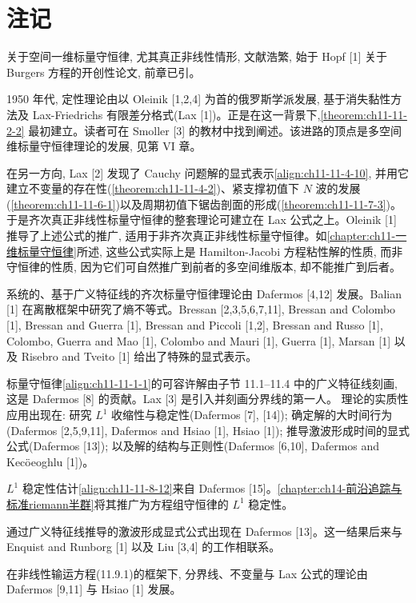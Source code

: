 \documentclass[../../main.tex]{subfiles}
\begin{document}
\section{注记}\label{section:ch11-注记}

关于空间一维标量守恒律, 尤其真正非线性情形, 文献浩繁, 始于 Hopf [1] 关于 Burgers 方程的开创性论文, 前章已引。

1950 年代, 定性理论由以 Oleinik [1,2,4] 为首的俄罗斯学派发展, 基于消失黏性方法及 Lax-Friedrichs 有限差分格式(Lax [1])。正是在这一背景下,\cref{theorem:ch11-11-2-2} 最初建立。读者可在 Smoller [3] 的教材中找到阐述。该进路的顶点是多空间维标量守恒律理论的发展, 见第 VI 章。

在另一方向, Lax [2] 发现了 Cauchy 问题解的显式表示\eqref{align:ch11-11-4-10}, 并用它建立不变量的存在性(\cref{theorem:ch11-11-4-2})、紧支撑初值下 $N$ 波的发展(\cref{theorem:ch11-11-6-1})以及周期初值下锯齿剖面的形成(\cref{theorem:ch11-11-7-3})。于是齐次真正非线性标量守恒律的整套理论可建立在 Lax 公式之上。Oleinik [1] 推导了上述公式的推广, 适用于非齐次真正非线性标量守恒律。如\cref{chapter:ch11-一维标量守恒律}所述, 这些公式实际上是 Hamilton-Jacobi 方程粘性解的性质, 而非守恒律的性质, 因为它们可自然推广到前者的多空间维版本, 却不能推广到后者。


系统的、基于广义特征线的齐次标量守恒律理论由 Dafermos [4,12] 发展。Balian [1] 在离散框架中研究了熵不等式。Bressan [2,3,5,6,7,11], Bressan and Colombo [1], Bressan and Guerra [1], Bressan and Piccoli [1,2], Bressan and Russo [1], Colombo, Guerra and Mao [1], Colombo and Mauri [1], Guerra [1], Marsan [1] 以及 Risebro and Tveito [1] 给出了特殊的显式表示。

标量守恒律\eqref{align:ch11-11-1-1}的可容许解由子节 11.1--11.4 中的广义特征线刻画, 这是 Dafermos [8] 的贡献。Lax [3] 是引入并刻画分界线的第一人。
理论的实质性应用出现在: 研究 $L^1$ 收缩性与稳定性(Dafermos [7], [14]); 确定解的大时间行为(Dafermos [2,5,9,11], Dafermos and Hsiao [1], Hsiao [1]); 推导激波形成时间的显式公式(Dafermos [13]); 以及解的结构与正则性(Dafermos [6,10], Dafermos and Kecöeoghlu [1])。

$L^1$ 稳定性估计\eqref{align:ch11-11-8-12}来自 Dafermos [15]。\cref{chapter:ch14-前沿追踪与标准riemann半群}将其推广为方程组守恒律的 $L^1$ 稳定性。


通过广义特征线推导的激波形成显式公式出现在 Dafermos [13]。这一结果后来与 Enquist and Runborg [1] 以及 Liu [3,4] 的工作相联系。

在非线性输运方程(11.9.1)的框架下, 分界线、不变量与 Lax 公式的理论由 Dafermos [9,11] 与 Hsiao [1] 发展。
\end{document}
